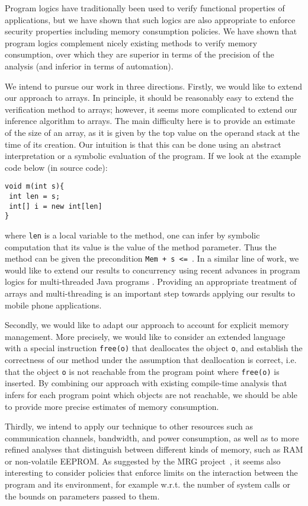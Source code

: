 
Program logics have traditionally been used to verify functional
properties of applications, but we have shown that such logics 
are also appropriate to enforce security properties including
memory consumption policies. We have shown that program logics
complement nicely existing methods to verify memory consumption,
over which they are superior in terms of the precision of the
analysis (and inferior in terms of automation).


We intend to pursue our work in three directions. Firstly, we would
like to extend our approach to arrays. In principle, it should be
reasonably easy to extend the verification method to arrays; however,
it seems more complicated to extend our inference algorithm to arrays.
The main difficulty here is to provide an estimate of the size of an
array, as it is given by the top value on the operand stack at the
time of its creation. Our intuition is that this can be done using
an abstract interpretation or a symbolic evaluation of the program. 
If we look at the example code below (in source code): 
\begin{verbatim}
void m(int s){
 int len = s;
 int[] i = new int[len]
} 
\end{verbatim}
where \verb!len! is a local variable to the method, one can infer by
symbolic computation that its value is the value of the method
parameter. Thus the method can be given the precondition \texttt{Mem +
s <= \Max}. In a similar line of work, we would like to extend our
results to concurrency using recent advances in program logics for
multi-threaded Java programs \cite{RDFHL05ess}. Providing an appropriate
treatment of arrays and multi-threading is an important step towards
applying our results to mobile phone applications.



Secondly, we would like to adapt our approach to account for explicit
memory management. More precisely, we would like to consider an
extended language with a special instruction \texttt{free(o)} that
deallocates the object \texttt{o}, and establish the correctness of
our method under the assumption that deallocation is correct, i.e.
that the object \texttt{o} is not reachable from the program point
where \texttt{free(o)} is inserted. By combining our approach with
existing compile-time analysis that infers for each program point
which objects are not reachable, we should be able to provide more
precise estimates of memory consumption.




Thirdly, we intend to apply our technique to other resources such as
communication channels, bandwidth, and power consumption, as well as
to more refined analyses that distinguish between different kinds of
memory, such as RAM or non-volatile EEPROM.  As suggested by the MRG
project~\cite{asp+04:cassis}, it seems also interesting to consider
policies that enforce limits on the interaction between the program
and its environment, for example w.r.t. the number of system calls or
the bounds on parameters passed to them.



